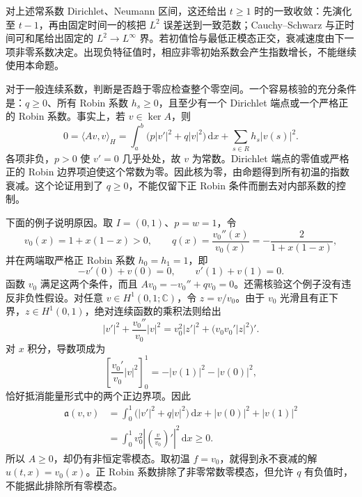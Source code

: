 对上述常系数 Dirichlet、Neumann 区间，这还给出 \(t\geq1\) 时的一致收敛：先演化至 \(t-1\)，再由固定时间一的核把 \(L^2\) 误差送到一致范数；Cauchy--Schwarz 与正时间可和尾给出固定的 \(L^2\to L^\infty\) 界。若初值恰与最低正模态正交，衰减速度由下一项非零系数决定。出现负特征值时，相应非零初始系数会产生指数增长，不能继续使用本命题。

\ProseParagraphBreak

对于一般连续系数，判断是否趋于零应检查整个零空间。一个容易核验的充分条件是：\(q\geq0\)、所有 Robin 系数 \(h_s\geq0\)，且至少有一个 Dirichlet 端点或一个严格正的 Robin 系数。事实上，若 \(v\in\ker A\)，则
\[
 0=\langle Av,v\rangle_H
  =\int_a^b\bigl(p|v'|^2+q|v|^2\bigr)\,\mathrm{d}x
    +\sum_{s\in R}h_s|v(s)|^2.
\]
各项非负，\(p>0\) 使 \(v'=0\) 几乎处处，故 \(v\) 为常数。Dirichlet 端点的零值或严格正的 Robin 边界项迫使这个常数为零。因此核为零，由命题得到所有初温的指数衰减。这个论证用到了 \(q\geq0\)，不能仅留下正 Robin 条件而删去对内部系数的控制。

下面的例子说明原因。取 \(I=(0,1)\)、\(p=w=1\)，令
\[
 v_0(x)=1+x(1-x)>0,\qquad
 q(x)=\frac{v_0''(x)}{v_0(x)}=-\frac2{1+x(1-x)},
\]
并在两端取严格正 Robin 系数 \(h_0=h_1=1\)，即
\[
 -v'(0)+v(0)=0,\qquad v'(1)+v(1)=0.
\]
函数 \(v_0\) 满足这两个条件，而且 \(Av_0=-v_0''+qv_0=0\)。还需核验这个例子没有违反非负性假设。对任意 \(v\in H^1(0,1;\mathbb C)\)，令 \(z=v/v_0\)。由于 \(v_0\) 光滑且有正下界，\(z\in H^1(0,1)\)，绝对连续函数的乘积法则给出
\[
 |v'|^2+\frac{v_0''}{v_0}|v|^2
 =v_0^2|z'|^2+\bigl(v_0v_0'|z|^2\bigr)'.
\]
对 \(x\) 积分，导数项成为
\[
 \left[\frac{v_0'}{v_0}|v|^2\right]_0^1
 =-|v(1)|^2-|v(0)|^2,
\]
恰好抵消能量形式中的两个正边界项。因此
\begin{equation}\label{b2:eq:12-robin-zero-mode-factorization}
 \begin{aligned}
 \mathfrak a(v,v)
 &=\int_0^1\bigl(|v'|^2+q|v|^2\bigr)\,\mathrm{d}x
       +|v(0)|^2+|v(1)|^2\\
 &=\int_0^1v_0^2\left|\left(\frac v{v_0}\right)'\right|^2\,\mathrm{d}x
 \geq0.
 \end{aligned}
\end{equation}
所以 \(A\geq0\)，却仍有非恒定零模态。取初温 \(f=v_0\)，就得到永不衰减的解 \(u(t,x)=v_0(x)\)。正 Robin 系数排除了非零常数零模态，但允许 \(q\) 有负值时，不能据此排除所有零模态。

\ProseParagraphBreak

